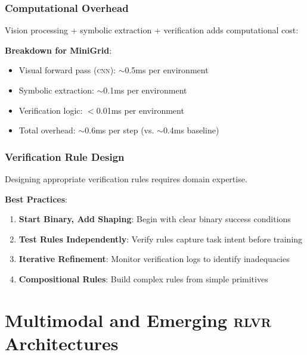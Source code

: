 \documentclass[11pt,a4paper]{article}
\newcommand{\rlvr}{\textsc{rlvr}}
\newcommand{\cnn}{\textsc{cnn}}
\begin{document}
\subsubsection{Computational Overhead}

Vision processing + symbolic extraction + verification adds computational cost:

\textbf{Breakdown for MiniGrid}:
\begin{itemize}[leftmargin=*]
    \item Visual forward pass (\cnn{}): $\sim$0.5ms per environment
    \item Symbolic extraction: $\sim$0.1ms per environment
    \item Verification logic: $<$0.01ms per environment
    \item Total overhead: $\sim$0.6ms per step (vs. $\sim$0.4ms baseline)
\end{itemize}

\subsubsection{Verification Rule Design}

Designing appropriate verification rules requires domain expertise.

\textbf{Best Practices}:
\begin{enumerate}[leftmargin=*]
    \item \textbf{Start Binary, Add Shaping}: Begin with clear binary success conditions
    \item \textbf{Test Rules Independently}: Verify rules capture task intent before training
    \item \textbf{Iterative Refinement}: Monitor verification logs to identify inadequacies
    \item \textbf{Compositional Rules}: Build complex rules from simple primitives
\end{enumerate}

\section{Multimodal and Emerging \rlvr{} Architectures}
\label{sec:multimodal}

\end{document}
